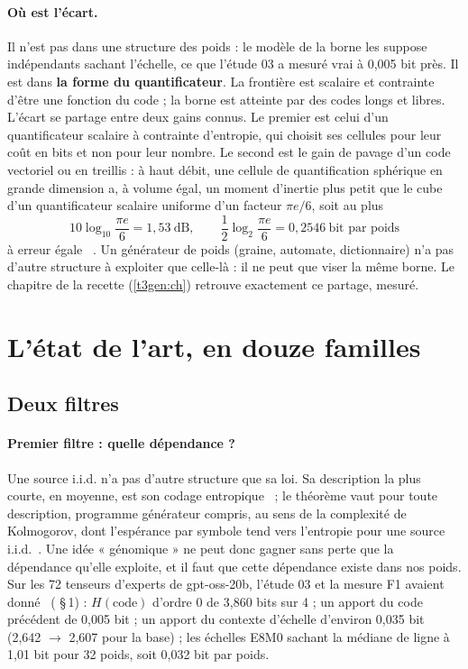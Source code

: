 \paragraph{Où est l'écart.} Il n'est pas dans une structure des poids : le modèle de la borne les suppose indépendants sachant l'échelle, ce que l'étude 03 a mesuré vrai à 0,005 bit près. Il est dans \textbf{la forme du quantificateur}. La frontière est scalaire et contrainte d'être une fonction du code ; la borne est atteinte par des codes longs et libres. L'écart se partage entre deux gains connus. Le premier est celui d'un quantificateur scalaire à contrainte d'entropie, qui choisit ses cellules pour leur coût en bits et non pour leur nombre. Le second est le gain de pavage d'un code vectoriel ou en treillis : à haut débit, une cellule de quantification sphérique en grande dimension a, à volume égal, un moment d'inertie plus petit que le cube d'un quantificateur scalaire uniforme d'un facteur $\pi e / 6$, soit au plus
\begin{equation}\label{t3que:eq:pavage}
10 \log_{10} \frac{\pi e}{6} = 1{,}53\ \text{dB}, \qquad \frac12 \log_2 \frac{\pi e}{6} = 0{,}2546\ \text{bit par poids}
\end{equation}
à erreur égale \calc~\cite{gish1968,marcellin1990}. Un générateur de poids (graine, automate, dictionnaire) n'a pas d'autre structure à exploiter que celle-là : il ne peut que viser la même borne. Le chapitre de la recette (\cref{t3gen:ch}) retrouve exactement ce partage, mesuré.

\section{L'état de l'art, en douze familles}\label{t3que:sec:familles}

\subsection{Deux filtres}

\paragraph{Premier filtre : quelle dépendance ?} Une source i.i.d. n'a pas d'autre structure que sa loi. Sa description la plus courte, en moyenne, est son codage entropique~\cite{shannon1948} ; le théorème vaut pour toute description, programme générateur compris, au sens de la complexité de Kolmogorov, dont l'espérance par symbole tend vers l'entropie pour une source i.i.d.~\cite[chapitre 14]{cover2006}. Une idée « génomique » ne peut donc gagner sans perte que la dépendance qu'elle exploite, et il faut que cette dépendance existe dans nos poids. Sur les 72 tenseurs d'experts de gpt-oss-20b, l'étude 03 et la mesure F1 avaient donné \mes~( §\,1) : $H(\text{code})$ d'ordre 0 de 3,860 bits sur 4 ; un apport du code précédent de 0,005 bit ; un apport du contexte d'échelle d'environ 0,035 bit (2,642 $\to$ 2,607 pour la base) ; les échelles E8M0 sachant la médiane de ligne à 1,01 bit pour 32 poids, soit 0,032 bit par poids.

